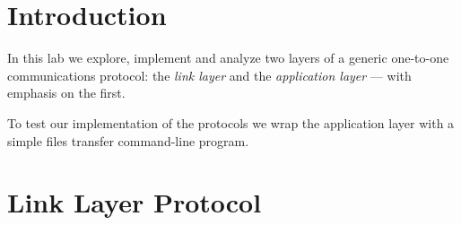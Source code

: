 \documentclass[compilation.tex]{subfiles}
\begin{document}
\section{Introduction}
\label{sec:intro}

In this lab we explore, implement and analyze two layers of a generic one-to-one communications protocol: the \emph{link layer} and the \emph{application layer} --- with emphasis on the first.

To test our implementation of the protocols we wrap the application layer with a simple files transfer command-line program.

\section{Link Layer Protocol}
\label{sec:llprotocol}
\end{document}
